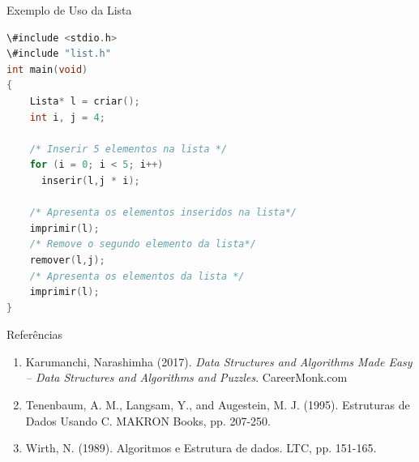 \begin{frame}[fragile,c]{Exemplo de Uso da Lista}

\begin{lstlisting}[language=C]
\#include <stdio.h>
\#include "list.h"
int main(void)
{
    Lista* l = criar();
    int i, j = 4;
    
    /* Inserir 5 elementos na lista */
    for (i = 0; i < 5; i++)
      inserir(l,j * i);
    
    /* Apresenta os elementos inseridos na lista*/    
    imprimir(l);
    /* Remove o segundo elemento da lista*/
    remover(l,j);
    /* Apresenta os elementos da lista */    
    imprimir(l);        
}
\end{lstlisting}

\end{frame} 


\begin{frame}{Referências}
	\begin{enumerate}
	
		
		\item Karumanchi, Narashimha (2017). 
		\textit{Data Structures and Algorithms Made Easy -- Data Structures and Algorithms
		and Puzzles}.  CareerMonk.com

	
		\item Tenenbaum, A. M., Langsam, Y., and Augestein, M. J. (1995). Estruturas de Dados Usando C. MAKRON Books, pp. 207-250.
		\item Wirth, N. (1989). Algoritmos e Estrutura de dados. LTC, pp. 151-165.
	\end{enumerate}
\end{frame}
